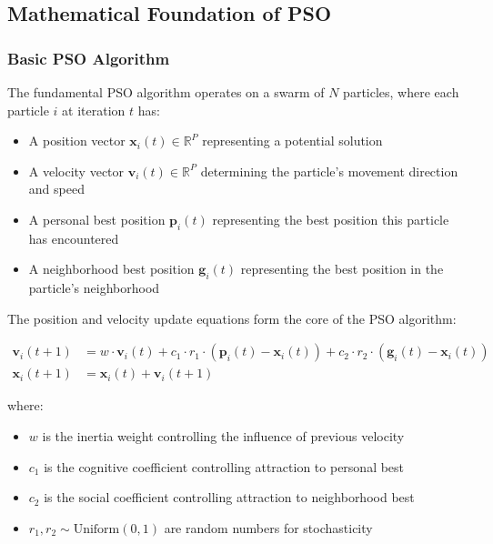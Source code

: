\documentclass[12pt,a4paper]{article}
\begin{document}
\subsection{Mathematical Foundation of PSO}

\subsubsection{Basic PSO Algorithm}

The fundamental PSO algorithm operates on a swarm of $N$ particles, where each particle $i$ at iteration $t$ has:
\begin{itemize}
    \item A position vector $\mathbf{x}_i(t) \in \mathbb{R}^P$ representing a potential solution
    \item A velocity vector $\mathbf{v}_i(t) \in \mathbb{R}^P$ determining the particle's movement direction and speed
    \item A personal best position $\mathbf{p}_i(t)$ representing the best position this particle has encountered
    \item A neighborhood best position $\mathbf{g}_i(t)$ representing the best position in the particle's neighborhood
\end{itemize}

The position and velocity update equations form the core of the PSO algorithm:

\begin{align}
\mathbf{v}_i(t+1) &= w \cdot \mathbf{v}_i(t) + c_1 \cdot r_1 \cdot (\mathbf{p}_i(t) - \mathbf{x}_i(t)) + c_2 \cdot r_2 \cdot (\mathbf{g}_i(t) - \mathbf{x}_i(t)) \label{eq:pso_velocity_update} \\
\mathbf{x}_i(t+1) &= \mathbf{x}_i(t) + \mathbf{v}_i(t+1) \label{eq:pso_position_update}
\end{align}

where:
\begin{itemize}
    \item $w$ is the inertia weight controlling the influence of previous velocity
    \item $c_1$ is the cognitive coefficient controlling attraction to personal best
    \item $c_2$ is the social coefficient controlling attraction to neighborhood best
    \item $r_1, r_2 \sim \text{Uniform}(0,1)$ are random numbers for stochasticity
\end{itemize}
\end{document}
